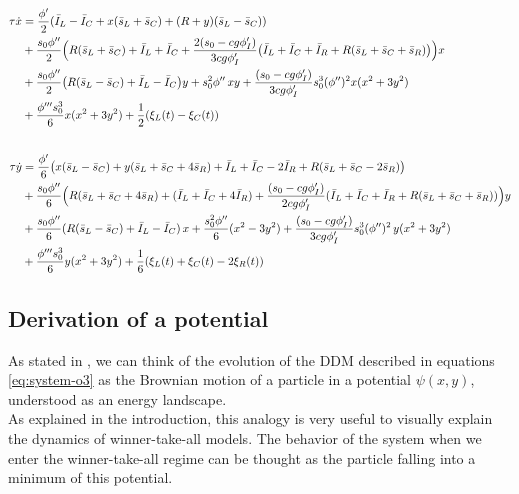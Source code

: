 \documentclass[../main.tex]{subfiles}
\begin{document}
\begin{subequations}\label{eq:system-o3} %

\begin{align}
\tau \dot{x} &=\frac{\phi'}{2}(\bar{I}_L -  \bar{I}_C + x(\bar{s}_L+ \bar{s}_C)+(R+y) (\bar{s}_L - \bar{s}_C))  \notag\\
&+ \frac{s_0\phi''}{2}\Bigl(R(\bar{s}_L+\bar{s}_C) +\bar{I}_L + \bar{I}_C + \frac{2(s_0-cg\phi'_I)}{3cg\phi'_I}\bigl(\bar{I}_L+\bar{I}_C+\bar{I}_R + R(\bar{s}_L+ \bar{s}_C+ \bar{s}_R)\bigr)\Bigr)x \notag\\
&+ \frac{s_0\phi''}{2}\bigl(R(\bar{s}_L-\bar{s}_C) + \bar{I}_L - \bar{I}_C\bigr)y 
  + s_0^2\phi''\,xy 
  + \frac{(s_0-cg\phi'_I)}{3cg\phi'_I} s_0^3(\phi'')^2 x(x^2+3y^2) \label{eq:system-o3-x}\\
&+ \frac{\phi'''s_0^3}{6}  x(x^2+3y^2) 
  + \frac12(\xi_L(t)-\xi_C(t))\notag\\[2em]
\tau \dot{y} &= \frac{\phi'}{6}\bigl(x(\bar{s}_L- \bar{s}_C)+y(\bar{s}_L +\bar{s}_C+4\bar{s}_R)
  +\bar{I}_L +  \bar{I}_C - 2 \bar{I}_R +  R(\bar{s}_L+ \bar{s}_C -2\bar{s}_R)\bigr) \notag\\
&+ \frac{s_0\phi''}{6}\Bigl(R(\bar{s}_L+\bar{s}_C+4\bar{s}_R) + (\bar{I}_L + \bar{I}_C + 4\bar{I}_R) 
  + \frac{(s_0-cg\phi'_I)}{2cg\phi'_I}(\bar{I}_L+\bar{I}_C+\bar{I}_R + R(\bar{s}_L+ \bar{s}_C+\bar{s}_R))\Bigr)y \notag\\
&+ \frac{s_0\phi''}{6}(R(\bar{s}_L-\bar{s}_C) + \bar{I}_L - \bar{I}_C)\,x
  + \frac{s_0^2\phi''}{6}(x^2-3y^2) + \frac{(s_0-cg\phi'_I)}{3cg\phi'_I}s_0^3(\phi'')^2\,y(x^2+3y^2) \label{eq:system-o3-y}\\
& + \frac{\phi'''s_0^3}{6}y(x^2+3y^2)
  + \frac16(\xi_L(t)+\xi_C(t)-2\xi_R(t))\notag
\end{align}

\end{subequations}


\subsection{Derivation of a potential}\label{sec:derivation-potential}
As stated in \cite{roxin2008}, we can think of the evolution of the DDM described in equations \ref{eq:system-o3} as the Brownian motion of a particle in a potential $\psi(x,y)$, understood as an energy landscape.\\ 
As explained in the introduction, this analogy is very useful to visually explain the dynamics of winner-take-all models. The behavior of the system when we enter the winner-take-all regime can be thought as the particle falling into a minimum of this potential.
\end{document}
